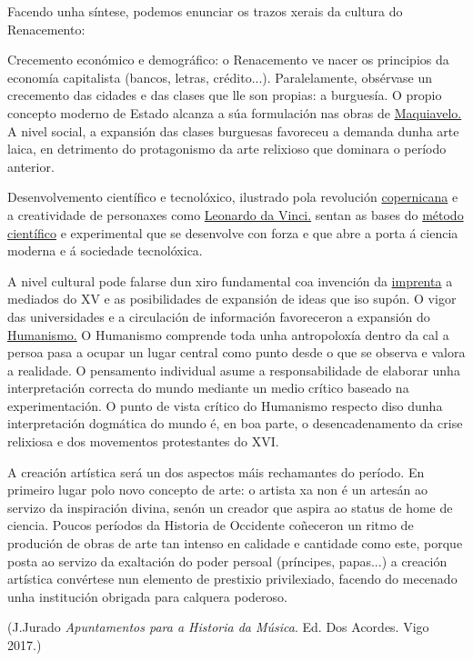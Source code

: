 %
%
%
Facendo unha síntese, podemos enunciar os trazos xerais da cultura do
Renacemento: 
\begin{multicols}{2}
Crecemento económico e demográfico: o Renacemento ve nacer os principios da economía capitalista (bancos, letras, crédito...). Paralelamente, obsérvase un crecemento das cidades e das clases que lle son propias: a burguesía. O propio concepto moderno de Estado alcanza a súa formulación nas obras de \href{http://es.wikipedia.org/wiki/Maquiavelo}{Maquiavelo.} A nivel social, a expansión das clases burguesas favoreceu a demanda dunha arte laica, en detrimento do protagonismo da arte relixioso que dominara o período anterior.
\par
Desenvolvemento científico e tecnolóxico, ilustrado pola revolución \href{http://es.wikipedia.org/wiki/Cop\%C3\%A9rnico}{copernicana} e a creatividade de personaxes como \href{http://es.wikipedia.org/wiki/Leonardo_da_Vinci}{Leonardo da Vinci.} sentan as bases do \href{http://es.wikipedia.org/wiki/M\%C3\%A9todo_cient\%C3\%ADfico}{método científico} e experimental que se desenvolve con forza e que abre a porta á ciencia moderna e á sociedade tecnolóxica.
\par
A nivel cultural pode falarse dun xiro fundamental coa invención da \href{http://es.wikipedia.org/wiki/Imprenta}{imprenta} a mediados do XV e as posibilidades de expansión de ideas que iso supón. O vigor das universidades e a circulación de información favoreceron a expansión do \href{http://es.wikipedia.org/wiki/Humanismo}{Humanismo.} O Humanismo comprende toda unha antropoloxía dentro da cal a persoa pasa a ocupar un lugar central como punto desde o que se observa e valora a realidade. O pensamento individual asume a responsabilidade de elaborar unha interpretación correcta do mundo mediante un medio crítico baseado na experimentación. O punto de vista crítico do Humanismo respecto diso dunha interpretación dogmática do mundo é, en boa parte, o desencadenamento da crise relixiosa e dos movementos protestantes do XVI.
\par
A creación artística será un dos aspectos máis rechamantes do período. En primeiro lugar polo novo concepto de arte: o artista xa non é un artesán ao servizo da inspiración divina, senón un creador que aspira ao status de home de ciencia. Poucos períodos da Historia de Occidente coñeceron un ritmo de produción de obras de arte tan intenso en calidade e cantidade como este, porque posta ao servizo da exaltación do poder persoal (príncipes, papas...) a creación artística convértese nun elemento de prestixio privilexiado, facendo do mecenado unha institución obrigada para calquera poderoso.\\
\par
\vspace*{0.25cm}
(J.Jurado \textit{Apuntamentos para a Historia da Música}. Ed. Dos Acordes. Vigo 2017.)
\\
%
\end{multicols}

